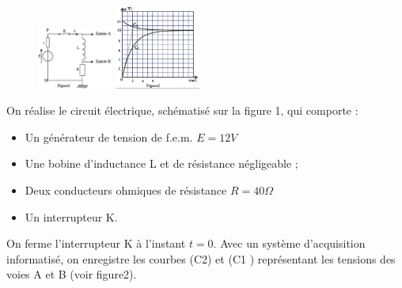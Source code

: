 \documentclass[12pt]{article}
\begin{document}
\begin{figure}
  \begin{center}
	  \vspace{-1cm}
	\includegraphics[width=0.22\textwidth]{./img/img03.png}
	\includegraphics[width=0.25\textwidth]{./img/img04.png}
  \end{center}
\end{figure}
On réalise le circuit électrique, schématisé sur la figure 1, qui comporte : 
	\begin{itemize}
		\item  Un générateur de tension de f.e.m. $E=12V$
		\item  Une bobine d’inductance L et de résistance négligeable ;
		\item  Deux conducteurs ohmiques de résistance $R = 40\Omega$
		\item  Un interrupteur K.

	\end{itemize}

On ferme l’interrupteur K à l’instant $t=0$. Avec un système d’acquisition informatisé, on enregistre les
courbes (C2) et (C1 ) représentant les tensions des voies A et B (voir figure2).
\end{document}
